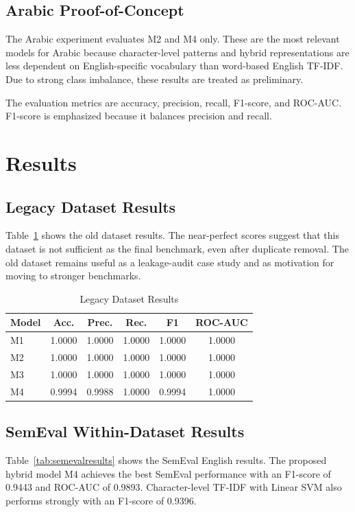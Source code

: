 \documentclass[conference]{IEEEtran}
\begin{document}
\subsection{Arabic Proof-of-Concept}
The Arabic experiment evaluates M2 and M4 only. These are the most relevant models for Arabic because character-level patterns and hybrid representations are less dependent on English-specific vocabulary than word-based English TF-IDF. Due to strong class imbalance, these results are treated as preliminary.

The evaluation metrics are accuracy, precision, recall, F1-score, and ROC-AUC. F1-score is emphasized because it balances precision and recall.

\section{Results}

\subsection{Legacy Dataset Results}
Table~\ref{tab:oldresults} shows the old dataset results. The near-perfect scores suggest that this dataset is not sufficient as the final benchmark, even after duplicate removal. The old dataset remains useful as a leakage-audit case study and as motivation for moving to stronger benchmarks.

\begin{table}[htbp]
\caption{Legacy Dataset Results}
\centering
\begin{tabular}{lccccc}
\toprule
Model & Acc. & Prec. & Rec. & F1 & ROC-AUC \\
\midrule
M1 & 1.0000 & 1.0000 & 1.0000 & 1.0000 & 1.0000 \\
M2 & 1.0000 & 1.0000 & 1.0000 & 1.0000 & 1.0000 \\
M3 & 1.0000 & 1.0000 & 1.0000 & 1.0000 & 1.0000 \\
M4 & 0.9994 & 0.9988 & 1.0000 & 0.9994 & 1.0000 \\
\bottomrule
\end{tabular}
\label{tab:oldresults}
\end{table}

\subsection{SemEval Within-Dataset Results}
Table~\ref{tab:semevalresults} shows the SemEval English results. The proposed hybrid model M4 achieves the best SemEval performance with an F1-score of 0.9443 and ROC-AUC of 0.9893. Character-level TF-IDF with Linear SVM also performs strongly with an F1-score of 0.9396.
\end{document}
